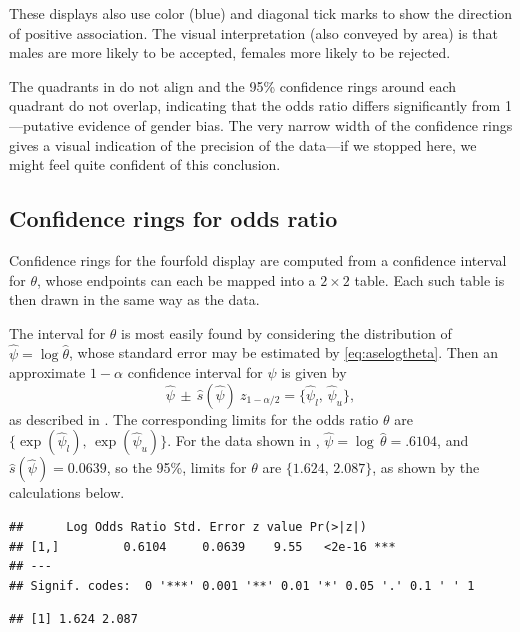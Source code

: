\documentclass[11pt]{book}
\renewenvironment{knitrout}{\small\renewcommand{\baselinestretch}{.85}}{} %
\begin{document}
These displays also use color (blue) and diagonal tick marks
to show the direction of positive association. The visual interpretation
(also conveyed by area) is that males are more likely to be accepted,
females more likely to be rejected.

The quadrants in  do not align and
the 95\% confidence rings around each quadrant do not overlap,
indicating that the odds ratio differs significantly from 1---putative
evidence of gender bias.  The very narrow
width of the confidence rings gives a visual indication of the
precision of the data---if we stopped here, we might feel quite confident of this conclusion.

\subsection{Confidence rings for odds ratio}
Confidence rings for the fourfold display are computed from a
confidence interval for \(\theta\), whose endpoints can each be
mapped into a \(2 \times  2\) table.  Each such table is then drawn
in the same way as the data.

The interval for \(\theta\) is most easily found by considering the
distribution of \(\hat{\psi}  =  \log  \hat{\theta} \), whose standard
error may be estimated by \eqref{eq:aselogtheta}.  Then an approximate \(1  -  \alpha\) confidence
interval for \(\psi\) is given by
\begin{equation*}
 \hat{\psi} \,\pm\,  \hat{s} ( \hat{\psi} )  \:
z_{ 1 - \alpha  / 2 } =  \{ \hat{\psi}_l , \,  \hat{\psi}_u \} 
 \comma
\end{equation*}
as described in .
The
corresponding limits for the odds ratio \(\theta\) are 
\(\{ \exp ( \hat{\psi}_l ) , \,  \exp ( \hat{\psi}_u ) \}\).  For the data
shown in , 
\(\hat{\psi}  =  \log \,  \hat{\theta} =  .6104\), 
and \(\hat{s}  ( \hat{\psi} )  =  0.0639\), so the 95\%,
limits for \(\theta\) are \(\{ 1.624, \,  2.087 \}\),
as shown by the calculations below.
\begin{knitrout}
\color{fgcolor}\begin{kframe}
\begin{alltt}
\hlstd{(}
\end{alltt}
\begin{verbatim}
##      Log Odds Ratio Std. Error z value Pr(>|z|)    
## [1,]         0.6104     0.0639    9.55   <2e-16 ***
## ---
## Signif. codes:  0 '***' 0.001 '**' 0.01 '*' 0.05 '.' 0.1 ' ' 1
\end{verbatim}
\begin{alltt}
\hlstd{(} \hlopt{+} \hlstd{(}\hlopt{-}\hlstd{,} \hlstd{)} \hlopt{*} \hlstd{(}\hlstd{)} \hlopt{*} \hlstd{)}
\end{alltt}
\begin{verbatim}
## [1] 1.624 2.087
\end{verbatim}
\end{kframe}
\end{knitrout}
\end{document}
